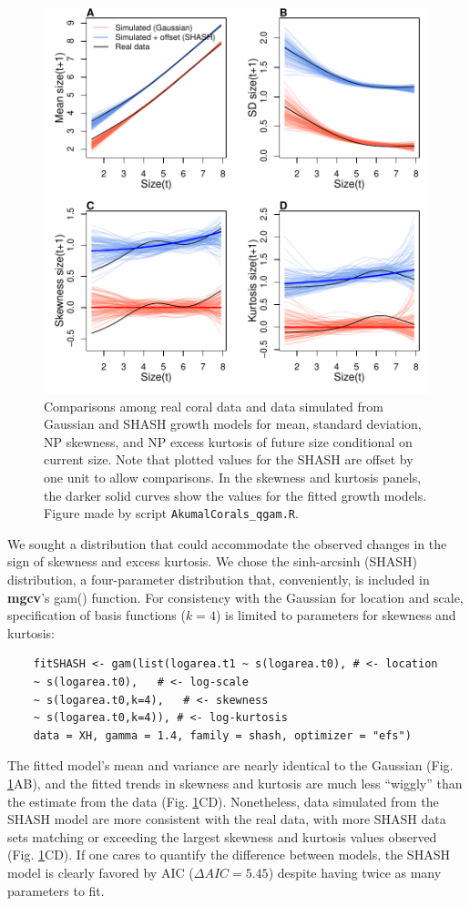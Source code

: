 \documentclass[12pt]{article}
\begin{document}
\begin{figure}[tbp]
	\centering
	\includegraphics[width=1.0\textwidth]{figures/coral_SHASH_fit.pdf}
	\caption{Comparisons among real coral data and data simulated from Gaussian and SHASH growth models for mean, 
		standard deviation, NP skewness, and NP excess kurtosis of future size conditional on current size. Note that plotted values for the SHASH are offset by one unit to allow comparisons. 
		In the skewness and kurtosis panels, the darker solid curves show the values for the fitted growth models. 
		Figure made by script \texttt{AkumalCorals\_qgam.R}.}
	\label{fig:coral_fit}
\end{figure} 

We sought a distribution that could accommodate the observed changes in the sign of skewness and excess kurtosis. We chose the sinh-arcsinh (SHASH) distribution, a four-parameter distribution that, 
conveniently, is included in \textbf{mgcv}'s gam() function. 
For consistency with the Gaussian for location and scale, specification of basis functions ($k=4$) is limited to parameters for skewness and kurtosis:
\begin{lstlisting}
	fitSHASH <- gam(list(logarea.t1 ~ s(logarea.t0), # <- location 
	~ s(logarea.t0),   # <- log-scale
	~ s(logarea.t0,k=4),   # <- skewness
	~ s(logarea.t0,k=4)), # <- log-kurtosis
	data = XH, gamma = 1.4, family = shash, optimizer = "efs")
\end{lstlisting}
The fitted model's mean and variance are nearly identical to the Gaussian (Fig. \ref{fig:coral_fit}AB), and the fitted trends in skewness and kurtosis are much less ``wiggly'' than the estimate from the data (Fig. \ref{fig:coral_fit}CD). 
Nonetheless, data simulated from the SHASH model are more consistent with the real data, with more SHASH data sets matching or exceeding the largest skewness and kurtosis values observed (Fig. \ref{fig:coral_fit}CD). 
If one cares to quantify the difference between models, the SHASH model is clearly favored by AIC ($\Delta AIC = 5.45$) despite having twice as many parameters to fit. 
\end{document}
